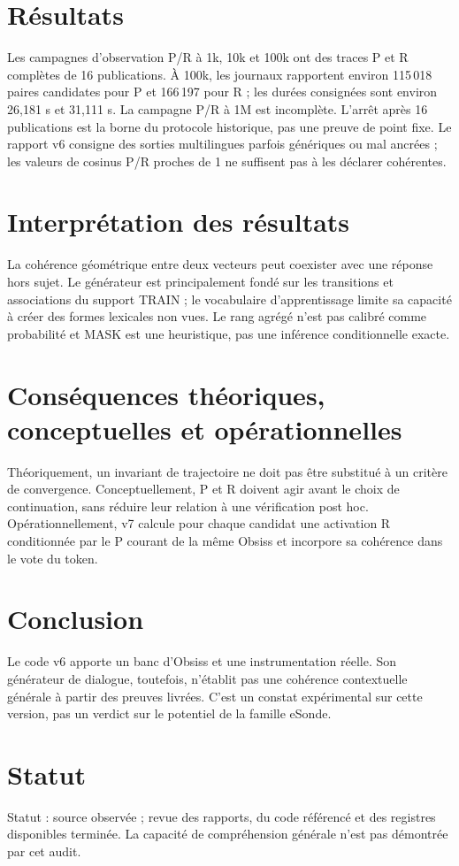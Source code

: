 \documentclass[11pt,a4paper]{report}
\begin{document}
\section{Résultats}
Les campagnes d'observation P/R à 1k, 10k et 100k ont des traces P et R complètes de 16 publications. À 100k, les journaux rapportent environ 115\,018 paires candidates pour P et 166\,197 pour R ; les durées consignées sont environ 26,181 s et 31,111 s. La campagne P/R à 1M est incomplète. L'arrêt après 16 publications est la borne du protocole historique, pas une preuve de point fixe. Le rapport v6 consigne des sorties multilingues parfois génériques ou mal ancrées ; les valeurs de cosinus P/R proches de 1 ne suffisent pas à les déclarer cohérentes.
\section{Interprétation des résultats}
La cohérence géométrique entre deux vecteurs peut coexister avec une réponse hors sujet. Le générateur est principalement fondé sur les transitions et associations du support TRAIN ; le vocabulaire d'apprentissage limite sa capacité à créer des formes lexicales non vues. Le rang agrégé n'est pas calibré comme probabilité et MASK est une heuristique, pas une inférence conditionnelle exacte.
\section{Conséquences théoriques, conceptuelles et opérationnelles}
Théoriquement, un invariant de trajectoire ne doit pas être substitué à un critère de convergence. Conceptuellement, P et R doivent agir avant le choix de continuation, sans réduire leur relation à une vérification post hoc. Opérationnellement, v7 calcule pour chaque candidat une activation R conditionnée par le P courant de la même Obsiss et incorpore sa cohérence dans le vote du token.
\section{Conclusion}
Le code v6 apporte un banc d'Obsiss et une instrumentation réelle. Son générateur de dialogue, toutefois, n'établit pas une cohérence contextuelle générale à partir des preuves livrées. C'est un constat expérimental sur cette version, pas un verdict sur le potentiel de la famille eSonde.
\section{Statut}
Statut : source observée ; revue des rapports, du code référencé et des registres disponibles terminée. La capacité de compréhension générale n'est pas démontrée par cet audit.
\end{document}

